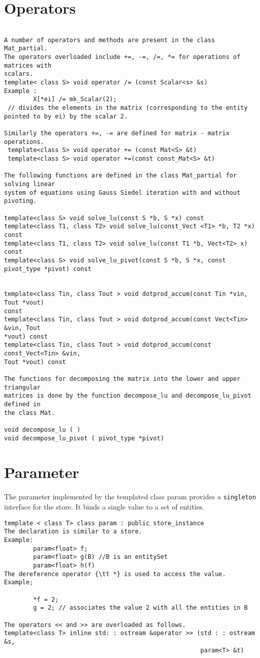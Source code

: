 \documentclass[letterpaper,12pt]{article}
\begin{document}
\section*{Operators }
\begin{verbatim}
 
A number of operators and methods are present in the class Mat_partial. 
The operators overloaded include +=, -=, /=, *= for operations of matrices with 
scalars.
template< class S> void operator /= (const Scalar<s> &s)
Example : 
        X[*ei] /= mk_Scalar(2); 
 // divides the elements in the matrix (corresponding to the entity pointed to by ei) by the scalar 2.

Similarly the operators +=, -= are defined for matrix - matrix operations. 
 template<class S> void operator += (const Mat<S> &t)
 template<class S> void operator +=(const const_Mat<S> &t)

The following functions are defined in the class Mat_partial for solving linear 
system of equations using Gauss Siedel iteration with and without pivoting. 

template<class S> void solve_lu(const S *b, S *x) const
template<class T1, class T2> void solve_lu(const_Vect <T1> *b, T2 *x) const
template<class T1, class T2> void solve_lu(const T1 *b, Vect<T2> x) const
template<class S> void solve_lu_pivot(const S *b, S *x, const pivot_type *pivot) const


template<class Tin, class Tout > void dotprod_accum(const Tin *vin, Tout *vout) 
const
template<class Tin, class Tout > void dotprod_accum(const Vect<Tin> &vin, Tout 
*vout) const
template<class Tin, class Tout > void dotprod_accum(const const_Vect<Tin> &vin, 
Tout *vout) const

The functions for decomposing the matrix into the lower and upper triangular 
matrices is done by the function decompose_lu and decompose_lu_pivot defined in 
the class Mat.

void decompose_lu ( )
void decompose_lu_pivot ( pivot_type *pivot)
\end{verbatim}

\section{Parameter}

The parameter implemented by the templated class param provides a {\tt singleton }
interface for the store. It binds a single value to a set of entities. 
 \begin{verbatim}
template < class T> class param : public store_instance
The declaration is similar to a store. 
Example:
        param<float> f;
        param<float> g(B) //B is an entitySet
        param<float> h(f)
The dereference operator {\tt *} is used to access the value.
Example;

        *f = 2;
        g = 2; // associates the value 2 with all the entities in B

The operators << and >> are overloaded as follows. 
template<class T> inline std: : ostream &operator >> (std : : ostream &s, 
                                                      param<T> &t) 
\end{verbatim}
\pagebreak[4]
\end{document}
